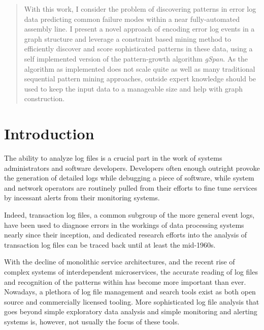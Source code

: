 \documentclass[pdftex,12pt,a4paper]{report}
\begin{document}
\deckblatt
\erklaerung

\begin{abstract}
With this work, I consider the problem of discovering patterns in error log data predicting common failure modes within a near fully-automated assembly line. I present a novel approach of encoding error log events in a graph structure and leverage a constraint based mining method to efficiently discover and score sophisticated patterns in these data, using a self implemented version of the pattern-growth algorithm \textit{gSpan}. As the algorithm as implemented does not scale quite as well as many traditional sequential pattern mining approaches, outside expert knowledge should be used to keep the input data to a manageable size and help with graph construction.
\end{abstract}

\tableofcontents

\chapter{Introduction}
The ability to analyze log files is a crucial part in the work of systems administrators and software developers. Developers often enough outright provoke the generation of detailed logs while debugging a piece of software, while system and network operators are routinely pulled from their efforts to fine tune services by incessant alerts from their monitoring systems.

Indeed, transaction log files, a common subgroup of the more general event logs, have been used to diagnose errors in the workings of data processing systems nearly since their inception, and dedicated research efforts into the analysis of transaction log files can be traced back until at least the mid-1960s.\cite{Peters1993-fw}

With the decline of monolithic service architectures, and the recent rise of complex systems of interdependent microservices,\cite{Dragoni2016-fh} the accurate reading of log files and recognition of the patterns within has become more important than ever. Nowadays, a plethora of log file management and search tools exist as both open source and commercially licensed tooling.\cite{noauthor_undated-bv}\cite{noauthor_undated-zu}\cite{noauthor_undated-vl}\cite{noauthor_undated-xi} More sophisticated log file analysis that goes beyond simple exploratory data analysis and simple monitoring and alerting systems is, however, not usually the focus of these tools.
\end{document}
